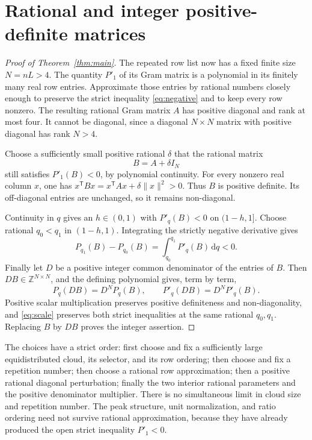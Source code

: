 \documentclass[11pt]{article}
\theoremstyle{remark}
\newcommand{\Z}{\mathbb Z}
\newcommand{\dd}{\,\mathrm d}
\begin{document}
\section{Rational and integer positive-definite matrices}\label{sec:integer}
\begin{proof}[Proof of Theorem~\ref{thm:main}]
The repeated row list now has a fixed finite size $N=nL>4$. The quantity $P'_1$ of its Gram matrix is a polynomial in its finitely many real row entries. Approximate those entries by rational numbers closely enough to preserve the strict inequality \eqref{eq:negative} and to keep every row nonzero. The resulting rational Gram matrix $A$ has positive diagonal and rank at most four. It cannot be diagonal, since a diagonal $N\times N$ matrix with positive diagonal has rank $N>4$.

Choose a sufficiently small positive rational $\delta$ that the rational matrix
\[
 B=A+\delta I_N
\]
still satisfies $P'_1(B)<0$, by polynomial continuity. For every nonzero real column $x$, one has $x^{\mathsf T}Bx=x^{\mathsf T}Ax+\delta\|x\|^2>0$. Thus $B$ is positive definite. Its off-diagonal entries are unchanged, so it remains non-diagonal.

Continuity in $q$ gives an $h\in(0,1)$ with $P'_q(B)<0$ on $(1-h,1]$. Choose rational $q_0<q_1$ in $(1-h,1)$. Integrating the strictly negative derivative gives
\[
 P_{q_1}(B)-P_{q_0}(B)=\int_{q_0}^{q_1}P'_q(B)\dd q<0.
\]
Finally let $D$ be a positive integer common denominator of the entries of $B$. Then $DB\in\Z^{N\times N}$, and the defining polynomial gives, term by term,
\begin{equation}\label{eq:scale}
 P_q(DB)=D^NP_q(B),\qquad P'_q(DB)=D^NP'_q(B).
\end{equation}
Positive scalar multiplication preserves positive definiteness and non-diagonality, and \eqref{eq:scale} preserves both strict inequalities at the same rational $q_0,q_1$. Replacing $B$ by $DB$ proves the integer assertion.
\end{proof}

The choices have a strict order: first choose and fix a sufficiently large equidistributed cloud, its selector, and its row ordering; then choose and fix a repetition number; then choose a rational row approximation; then a positive rational diagonal perturbation; finally the two interior rational parameters and the positive denominator multiplier. There is no simultaneous limit in cloud size and repetition number. The peak structure, unit normalization, and ratio ordering need not survive rational approximation, because they have already produced the open strict inequality $P'_1<0$.
\end{document}
